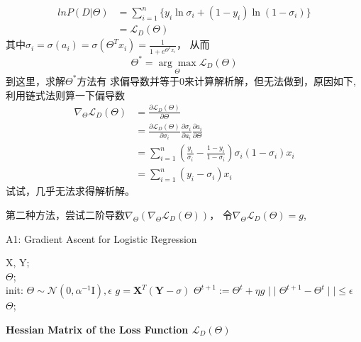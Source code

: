 \documentclass[UTF8]{ctexart}
\begin{document}
\begin{equation*}
    \begin{aligned}
        lnP(D|\Theta) &= \sum_{i=1}^n \{y_i\ln\sigma_i +(1-y_i)\ln(1-\sigma_i)\}    \\
        &= \mathcal{L}_D(\Theta)
    \end{aligned}
\end{equation*}
其中$\sigma_i=\sigma(a_i)=\sigma(\Theta^Tx_i)=\frac{1}{1+e^{\Theta^Tx_i}}$， 从而
\begin{equation*}
    \Theta^* = \underset{\Theta}{\arg \max} {\mathcal{L}_D(\Theta)}
\end{equation*}
到这里，求解$\Theta^*$方法有 求偏导数并等于0来计算解析解，但无法做到，原因如下,利用链式法则算一下偏导数
\begin{equation*}
    \begin{aligned}
        \nabla_\Theta \mathcal{L}_D(\Theta) &=\frac{\partial \mathcal{L}_D ( \Theta) }{\partial \Theta} \\
        &= \frac{\partial\mathcal{L}_D ( \Theta)}{\partial \sigma_i}\frac{\partial \sigma_i}{\partial a_i}\frac{\partial a_i}{\partial \Theta}\\
        &= \sum_{i=1}^n(\frac{y_i}{\sigma_i}-\frac{1-y_i}{1-\sigma_i})\sigma_i(1-\sigma_i)x_i \\
        &= \sum_{i=1}^n(y_i-\sigma_i)x_i
    \end{aligned}
\end{equation*}
试试，几乎无法求得解析解。

第二种方法，尝试二阶导数$\nabla_\Theta(\nabla_\Theta \mathcal{L}_D(\Theta) )$， 令$\nabla_\Theta \mathcal{L}_D(\Theta) =g$,

\begin{algorithm}[htb]
    \caption{A1: Gradient Ascent for Logistic Regression}
    \label{alg:A1}
    \begin{algorithmic}[1]
    \REQUIRE
    X, Y; \\
    \ENSURE 
    $\Theta$; \\
    \STATE init: $\Theta \sim \mathcal{N}(0, \alpha^{-1}\mathrm{I}), \epsilon$
    \REPEAT 
    \STATE $g=\mathbf{X}^T(\mathbf{Y}-\sigma)$
    \STATE $\Theta^{t+1} := \Theta^t + \eta g$
    \UNTIL $\mid\mid \Theta^{t+1} -\Theta^t \mid\mid \leq \epsilon$
    \RETURN $\Theta$;
    \end{algorithmic}
\end{algorithm}

\textbf{Hessian Matrix of the Loss Function $\mathcal{L}_D(\Theta)$}
\end{document}
